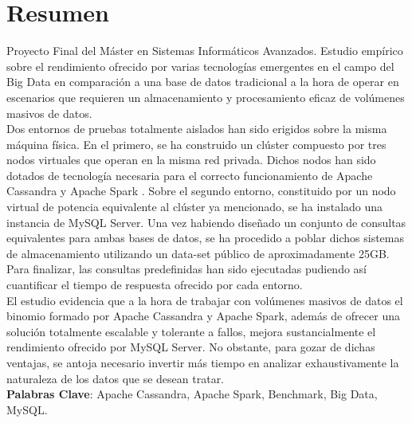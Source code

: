 \section*{Resumen}

Proyecto Final del Máster en Sistemas Informáticos Avanzados. Estudio empírico sobre el rendimiento ofrecido por varias tecnologías emergentes en el campo del Big Data en comparación a una base de datos tradicional a la hora de operar en escenarios que requieren un almacenamiento y procesamiento eficaz de volúmenes masivos de datos.\\

Dos entornos de pruebas totalmente aislados han sido erigidos sobre la misma máquina física. En el primero, se ha construido un clúster compuesto por tres nodos virtuales que operan en la misma red privada. Dichos nodos han sido dotados de tecnología necesaria para el correcto funcionamiento de Apache Cassandra \cite{lakshman2010cassandra} y Apache Spark \cite{zaharia2010spark}. Sobre el segundo entorno, constituido por un nodo virtual de potencia equivalente al clúster ya mencionado, se ha instalado una instancia de MySQL Server. Una vez habiendo diseñado un conjunto de consultas equivalentes para ambas bases de datos, se ha procedido a poblar dichos sistemas de almacenamiento utilizando un data-set público de aproximadamente 25GB. Para finalizar, las consultas predefinidas han sido ejecutadas pudiendo así cuantificar el tiempo de respuesta ofrecido por cada entorno.\\

El estudio evidencia que a la hora de trabajar con volúmenes masivos de datos el binomio formado por Apache Cassandra y Apache Spark, además de ofrecer una solución totalmente escalable y tolerante a fallos, mejora sustancialmente el rendimiento ofrecido por MySQL Server. No obstante, para gozar de dichas ventajas, se antoja necesario invertir más tiempo en analizar exhaustivamente la naturaleza de los datos que se desean tratar.\\

\textbf{Palabras Clave}: Apache Cassandra, Apache Spark, Benchmark, Big Data, MySQL.
